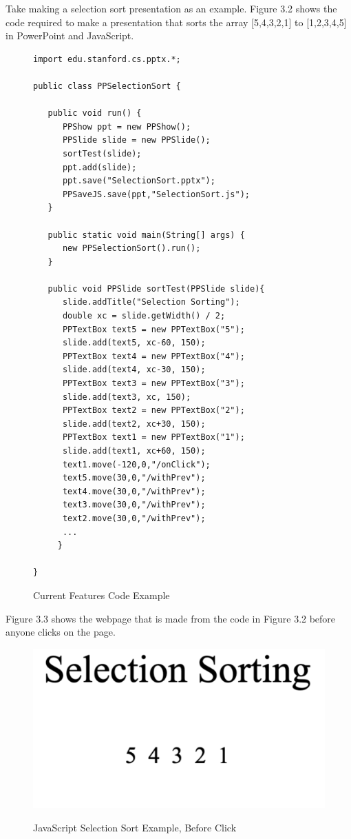 \documentclass[12pt,twoside]{reedthesis}
\begin{document}
Take making a selection sort presentation as an example. Figure 3.2 shows the code required to make a presentation that sorts the array [5,4,3,2,1] to [1,2,3,4,5] in PowerPoint and JavaScript.
\begin{figure}[h!tbp]
\caption{Current Features Code Example} 
\begin{lstlisting}[escapechar=!]
import edu.stanford.cs.pptx.*;

public class PPSelectionSort {

   public void run() {
      PPShow ppt = new PPShow();
      PPSlide slide = new PPSlide();
      sortTest(slide);
      ppt.add(slide);
      ppt.save("SelectionSort.pptx");
      PPSaveJS.save(ppt,"SelectionSort.js");
   }

   public static void main(String[] args) {
      new PPSelectionSort().run();
   }
   
   public void PPSlide sortTest(PPSlide slide){
      slide.addTitle("Selection Sorting");
      double xc = slide.getWidth() / 2;
      PPTextBox text5 = new PPTextBox("5");
      slide.add(text5, xc-60, 150);
      PPTextBox text4 = new PPTextBox("4");
      slide.add(text4, xc-30, 150);
      PPTextBox text3 = new PPTextBox("3");
      slide.add(text3, xc, 150);
      PPTextBox text2 = new PPTextBox("2");
      slide.add(text2, xc+30, 150);
      PPTextBox text1 = new PPTextBox("1");
      slide.add(text1, xc+60, 150);
      text1.move(-120,0,"/onClick");
      text5.move(30,0,"/withPrev");
      text4.move(30,0,"/withPrev");
      text3.move(30,0,"/withPrev");
      text2.move(30,0,"/withPrev");
      ...
     }
	
}
\end{lstlisting}
\end{figure} 
Figure 3.3 shows the webpage that is made from the code in Figure 3.2 before anyone clicks on the page.
\begin{figure}[htbp] 
\begin{centering} 
\caption{JavaScript Selection Sort Example, Before Click} 
\includegraphics[scale=0.7]{selsortbefore} 
\label{subd}
\end{centering} 
\end{figure}
\end{document}
